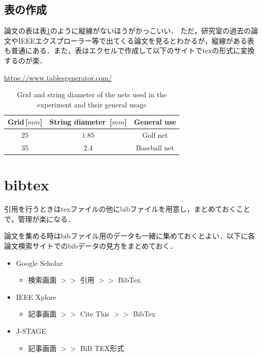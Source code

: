 \documentclass[twocolumn, a4paper]{Zemiresume}
\begin{document}
\subsection{表の作成}\label{subsec:表の作成}
論文の表は表\ref{tab:net_info}のように縦線がないほうがかっこいい．
ただ，研究室の過去の論文やIEEEエクスプローラー等で出てくる論文を見るとわかるが，縦線がある表も普通にある．また，表はエクセルで作成して以下のサイトでtexの形式に変換するのが楽．

{\footnotesize \url{https://www.tablesgenerator.com/}}

\begin{table}[t]
  \centering
  \caption{Grid and string diameter of the nets used in the experiment and their general usage}
  \label{tab:net_info}
  \small
  \begin{tabular}{ccc}
    \hline
    Grid\,[$\si{mm}$] & String diameter\ [$\si{mm}$] & General use \\ \hline
    $25$ & $1.85$ & Golf net \\
    $35$ & $2.4$  & Baseball net \\ \hline
  \end{tabular}
  \vspace{-10mm}%
\end{table}

\section{bibtex}
引用を行うときはtexファイルの他にbibファイルを用意し，まとめておくことで，管理が楽になる．

論文を集める時はbibファイル用のデータも一緒に集めておくとよい．以下に各論文検索サイトでのbibデータの見方をまとめておく．
\begin{itemize}
  \item Google Scholar
  \begin{itemize}
    \item 検索画面 $>>$ 引用 $>>$ BibTex
  \end{itemize}
  \item IEEE Xplore
  \begin{itemize}
    \item 記事画面 $>>$ Cite This $>>$ BibTex
  \end{itemize}
  \item J-STAGE
  \begin{itemize}
    \item 記事画面 $>>$ BiB TEX形式
  \end{itemize}
\end{itemize}
\end{document}
